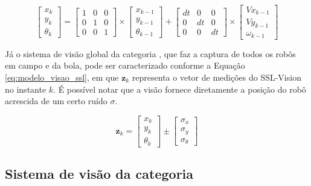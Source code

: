 \documentclass[acronym, symbols, table]{fei}
\begin{document}
		\begin{equation}\label{eq:modelo_sistema_ssl}
			\begin{bmatrix}
				x_k \\
				y_k \\
				\theta_k
			\end{bmatrix} = 
			\begin{bmatrix}
				1 & 0 & 0 \\
				0 & 1 & 0 \\
				0 & 0 & 1
			\end{bmatrix} \times
			\begin{bmatrix}
				x_{k-1} \\
				y_{k-1} \\
				\theta_{k-1}
			\end{bmatrix} + 
			\begin{bmatrix}
				dt & 0 & 0 \\
				0 & dt & 0 \\
				0 & 0 & dt
			\end{bmatrix} \times
			\begin{bmatrix}
				Vx_{k-1} \\
				Vy_{k-1} \\
				\omega_{k-1}
			\end{bmatrix}
		\end{equation}
		
		Já o sistema de visão global da categoria , que faz a captura de todos os robôs em campo e da bola, pode ser caracterizado conforme a Equação \eqref{eq:modelo_visao_ssl}, em que $\textbf{z}_{k}$ representa o vetor de medições do SSL-Vision no instante $k$. É possível notar que a visão fornece diretamente a posição do robô acrescida de um certo ruído $\sigma$.
		
		\begin{equation}\label{eq:modelo_visao_ssl}
			\textbf{z}_k  = 
			\begin{bmatrix}
				x_k \\
				y_k \\
				\theta_k
			\end{bmatrix} \pm
			\begin{bmatrix}
				\sigma_x \\
				\sigma_y \\
				\sigma_{\theta}
			\end{bmatrix}
		\end{equation}
		
		\subsection{Sistema de visão da categoria }
		
\end{document}

